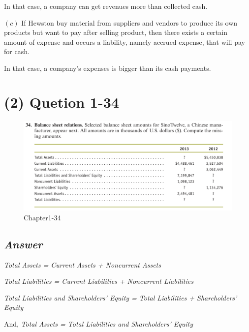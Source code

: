 \documentclass[
  letterpaper,
  DIV=11,
  numbers=noendperiod]{scrreprt}
\begin{document}
In that case, a company can get revenues more than collected cash.

\textbf{\((c)\)} If Hewston buy material from suppliers and vendors to
produce its own products but want to pay after selling product, then
there exists a certain amount of expense and occurs a liability, namely
accrued expense, that will pay for cash.

In that case, a company's expenses is bigger than its cash payments.

\section*{(2) Quetion 1-34}\label{quetion-1-34}


\begin{figure}[H]

{\centering \includegraphics{images/재무회계_hw2_1-34.png}

}

\caption{Chapter1-34}

\end{figure}%

\subsection*{\texorpdfstring{\textbf{\emph{Answer}}}{Answer}}\label{answer-7}

\emph{Total Assets = Current Assets + Noncurrent Assets}

\emph{Total Liabilities = Current Liabilities + Noncurrent Liabilities}

\emph{Total Liabilities and Shareholders' Equity = Total Liabilities +
Shareholders' Equity}

And, \emph{Total Assets = Total Liabilities and Shareholders' Equity}
\end{document}
